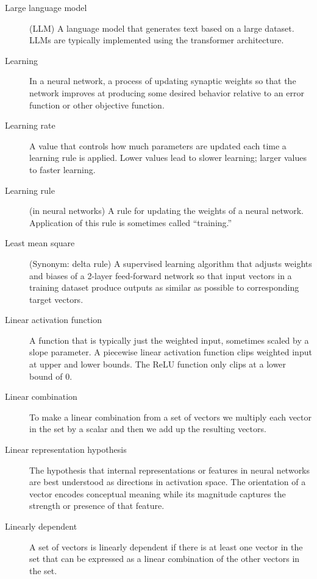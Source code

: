 \begin{description}
\item[Large language model] (LLM) A language model that generates text based on a large dataset.  LLMs are typically implemented using the transformer architecture.

\item[Learning] In a neural network, a process of updating synaptic weights so that the network improves at producing some desired behavior relative to an error function or other objective function.

\item[Learning rate] A value that controls how much parameters are updated each time a learning rule is applied. Lower values lead to slower learning; larger values to faster learning.

\item[Learning rule] (in neural networks) A rule for updating the weights of a neural network. Application of this rule is sometimes called ``training.''

\item[Least mean square] (Synonym: delta rule) A supervised learning algorithm that adjusts weights and biases of a 2-layer feed-forward network so that input vectors in a training dataset produce outputs as similar as possible to corresponding target vectors.

\item[Linear activation function] A function that is typically just the weighted input, sometimes scaled by a slope parameter. A piecewise linear activation function clips weighted input at  upper and lower bounds. The ReLU function only clips at a lower bound of 0.

\item[Linear combination] To make a linear combination from a set of vectors we multiply each vector in the set by a scalar and then we add up the resulting vectors.

\item[Linear representation hypothesis] The hypothesis that internal representations or features in neural networks are best understood as directions in activation space. The orientation of a vector encodes conceptual meaning while its magnitude captures the strength or presence of that feature.

\item[Linearly dependent] A set of vectors is linearly dependent if there is at least one vector in the set that can be expressed as a linear combination of the other vectors in the set.


\end{description}
